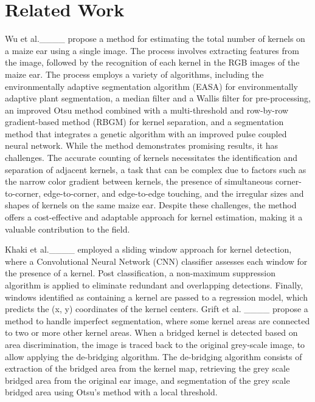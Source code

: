 \section{Related Work}
Wu et al.____ propose a method for estimating the total number of kernels on a maize ear using a single image. The process involves extracting features from the image, followed by the recognition of each kernel in the RGB images of the maize ear. The process employs a variety of algorithms, including the environmentally adaptive segmentation algorithm (EASA) for environmentally adaptive plant segmentation, a median filter and a Wallis filter for pre-processing, an improved Otsu method combined with a multi-threshold and row-by-row gradient-based method (RBGM) for kernel separation, and a segmentation method that integrates a genetic algorithm with an improved pulse coupled neural network. While the method demonstrates promising results, it has challenges. The accurate counting of kernels necessitates the identification and separation of adjacent kernels, a task that can be complex due to factors such as the narrow color gradient between kernels, the presence of simultaneous corner-to-corner, edge-to-corner, and edge-to-edge touching, and the irregular sizes and shapes of kernels on the same maize ear. Despite these challenges, the method offers a cost-effective and adaptable approach for kernel estimation, making it a valuable contribution to the field.

Khaki et al.____ employed a sliding window approach for kernel detection, where a Convolutional Neural Network (CNN) classifier assesses each window for the presence of a kernel. Post classification, a non-maximum suppression algorithm is applied to eliminate redundant and overlapping detections. Finally,  windows identified as containing a kernel are passed to a regression model, which predicts the (x, y) coordinates of the kernel centers. Grift et al. ____ propose a method to handle imperfect segmentation, where some kernel areas are connected to two or more other kernel areas. When a bridged kernel is detected based on area discrimination, the image is traced back to the original grey-scale image, to allow applying the de-bridging algorithm. The de-bridging algorithm consists of extraction of the bridged area from the kernel map, retrieving the grey scale bridged area from the original ear image, and segmentation of the grey scale bridged area using Otsu's method with a local threshold.
  


